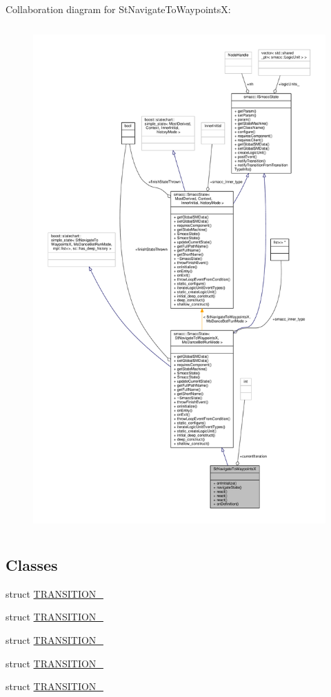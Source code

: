 Collaboration diagram for St\+Navigate\+To\+WaypointsX\+:
\nopagebreak
\begin{figure}[H]
\begin{center}
\leavevmode
\includegraphics[height=550pt]{structStNavigateToWaypointsX__coll__graph}
\end{center}
\end{figure}
\subsection*{Classes}
\begin{DoxyCompactItemize}
\item 
struct \hyperlink{structStNavigateToWaypointsX_1_1TRANSITION__1}{T\+R\+A\+N\+S\+I\+T\+I\+O\+N\+\_}
\item 
struct \hyperlink{structStNavigateToWaypointsX_1_1TRANSITION__2}{T\+R\+A\+N\+S\+I\+T\+I\+O\+N\+\_}
\item 
struct \hyperlink{structStNavigateToWaypointsX_1_1TRANSITION__3}{T\+R\+A\+N\+S\+I\+T\+I\+O\+N\+\_}
\item 
struct \hyperlink{structStNavigateToWaypointsX_1_1TRANSITION__4}{T\+R\+A\+N\+S\+I\+T\+I\+O\+N\+\_}
\item 
struct \hyperlink{structStNavigateToWaypointsX_1_1TRANSITION__5}{T\+R\+A\+N\+S\+I\+T\+I\+O\+N\+\_}
\end{DoxyCompactItemize}
